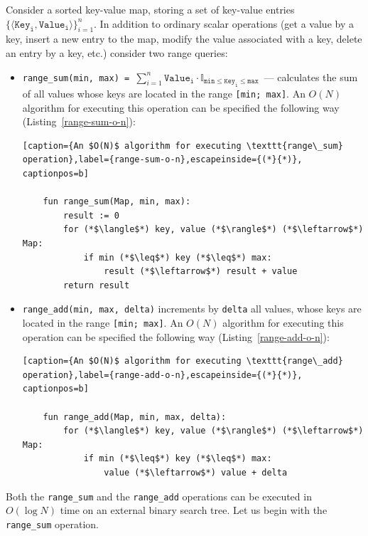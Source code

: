 \documentclass[times, dvipsnames,%
               languages={russian,english} %
              ]{itmo-student-thesis}
\begin{document}
Consider a sorted key-value map, storing a set of key-value entries $\{ \langle \texttt{Key}_{\texttt{i}}, \texttt{Value}_{\texttt{i}} \rangle \}_{i = 1}^n$. In addition to ordinary scalar operations (get a value by a key, insert a new entry to the map, modify the value associated with a key, delete an entry by a key, etc.) consider two range queries:

\begin{itemize}
    \item \texttt{range\_sum(min, max) = $\sum\limits_{i = 1}^n \texttt{Value}_{\texttt{i}} \cdot \mathbb{I}_{\texttt{min} \leq \texttt{Key}_\texttt{i} \leq \texttt{max}}$}~--- calculates the sum of all values whose keys are located in the range \texttt{[min; max]}. An $O(N)$ algorithm for executing this operation can be specified the following way (Listing~\ref{range-sum-o-n}): 
    
    \renewcommand{\lstlistingname}{Listing}
    \begin{lstlisting}[caption={An $O(N)$ algorithm for executing \texttt{range\_sum} operation},label={range-sum-o-n},escapeinside={(*}{*)}, captionpos=b]
    
    fun range_sum(Map, min, max):
        result := 0
        for (*$\langle$*) key, value (*$\rangle$*) (*$\leftarrow$*) Map:
            if min (*$\leq$*) key (*$\leq$*) max:
                result (*$\leftarrow$*) result + value
        return result
    \end{lstlisting}
    
    \item \texttt{range\_add(min, max, delta)} increments by \texttt{delta} all values, whose keys are located in the range \texttt{[min; max]}. An $O(N)$ algorithm for executing this operation can be specified the following way (Listing~\ref{range-add-o-n}): 
    
    \renewcommand{\lstlistingname}{Listing}
    \begin{lstlisting}[caption={An $O(N)$ algorithm for executing \texttt{range\_add} operation},label={range-add-o-n},escapeinside={(*}{*)}, captionpos=b]
    
    fun range_add(Map, min, max, delta):
        for (*$\langle$*) key, value (*$\rangle$*) (*$\leftarrow$*) Map:
            if min (*$\leq$*) key (*$\leq$*) max:
                value (*$\leftarrow$*) value + delta
    \end{lstlisting}
\end{itemize}

Both the \texttt{range\_sum} and the \texttt{range\_add} operations can be executed in $O(\log N)$ time on an external binary search tree. Let us begin with the \texttt{range\_sum} operation. 
\end{document}

